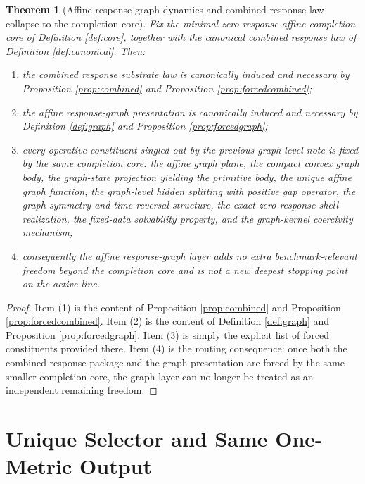 \documentclass[11pt]{article}
\newtheorem{theorem}{Theorem}
\begin{document}
\begin{theorem}[Affine response-graph dynamics and combined response law collapse to the completion core]
\label{thm:collapse}
Fix the minimal zero-response affine completion core of Definition \ref{def:core}, together with the canonical combined response law of Definition \ref{def:canonical}. Then:
\begin{enumerate}
    \item the combined response substrate law is canonically induced and necessary by Proposition \ref{prop:combined} and Proposition \ref{prop:forcedcombined};
    \item the affine response-graph presentation is canonically induced and necessary by Definition \ref{def:graph} and Proposition \ref{prop:forcedgraph};
    \item every operative constituent singled out by the previous graph-level note is fixed by the same completion core: the affine graph plane, the compact convex graph body, the graph-state projection yielding the primitive body, the unique affine graph function, the graph-level hidden splitting with positive gap operator, the graph symmetry and time-reversal structure, the exact zero-response shell realization, the fixed-data solvability property, and the graph-kernel coercivity mechanism;
    \item consequently the affine response-graph layer adds no extra benchmark-relevant freedom beyond the completion core and is not a new deepest stopping point on the active line.
\end{enumerate}
\end{theorem}

\begin{proof}
Item (1) is the content of Proposition \ref{prop:combined} and Proposition \ref{prop:forcedcombined}. Item (2) is the content of Definition \ref{def:graph} and Proposition \ref{prop:forcedgraph}. Item (3) is simply the explicit list of forced constituents provided there. Item (4) is the routing consequence: once both the combined-response package and the graph presentation are forced by the same smaller completion core, the graph layer can no longer be treated as an independent remaining freedom.
\end{proof}

\section{Unique Selector and Same One-Metric Output}
\end{document}

